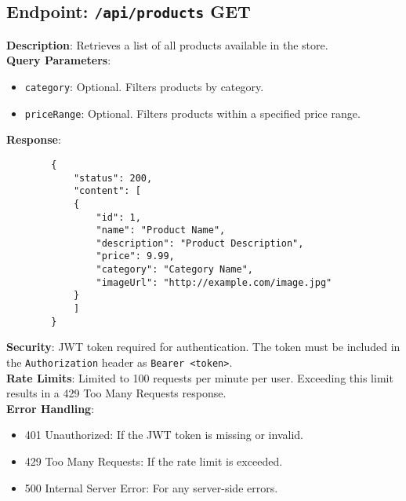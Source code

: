 \documentclass[a4paper,12pt]{article}
\begin{document}
	\subsection*{Endpoint: \texttt{/api/products} GET}
	\textbf{Description}: Retrieves a list of all products available in the store. \\
	\textbf{Query Parameters}:
	\begin{itemize}
		\item \texttt{category}: Optional. Filters products by category.
		\item \texttt{priceRange}: Optional. Filters products within a specified price range.
	\end{itemize}
	\textbf{Response}: 
	\begin{lstlisting}
		{
			"status": 200,
			"content": [
			{
				"id": 1,
				"name": "Product Name",
				"description": "Product Description",
				"price": 9.99,
				"category": "Category Name",
				"imageUrl": "http://example.com/image.jpg"
			}
			]
		}
	\end{lstlisting}
	\textbf{Security}: JWT token required for authentication. The token must be included in the \texttt{Authorization} header as \texttt{Bearer <token>}. \\
	\textbf{Rate Limits}: Limited to 100 requests per minute per user. Exceeding this limit results in a 429 Too Many Requests response. \\
	\textbf{Error Handling}:
	\begin{itemize}
		\item 401 Unauthorized: If the JWT token is missing or invalid.
		\item 429 Too Many Requests: If the rate limit is exceeded.
		\item 500 Internal Server Error: For any server-side errors.
	\end{itemize}
	
\end{document}
